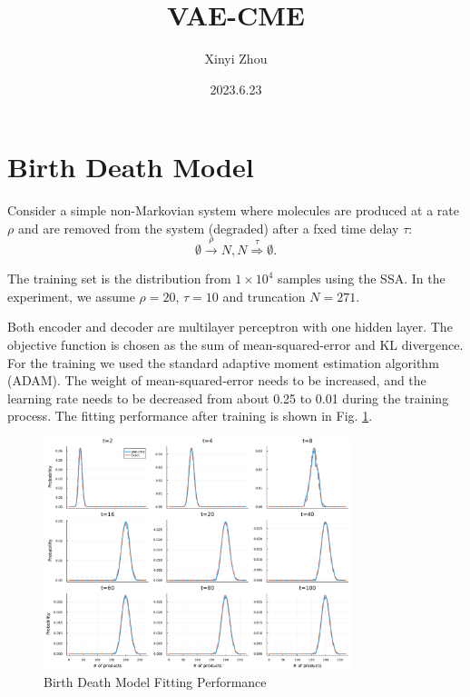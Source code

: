 \documentclass[a4paper,10pt]{article}
\title{VAE-CME}
\author{Xinyi Zhou}
\date{2023.6.23}
\begin{document}
\tableofcontents
\maketitle

\section{Birth Death Model}
Consider a simple non-Markovian system where molecules are produced at a rate $\rho$ and are removed from the system (degraded) after a fxed time delay $\tau$:
\begin{equation}\label{birth-death}
	\emptyset\stackrel{\rho}\rightarrow N, 
	N\stackrel{\tau}\Rightarrow\emptyset.
\end{equation}

The training set is the distribution from $1 \times 10^4$ samples using the SSA\cite{gillespie1977exact}. In the experiment, we assume $\rho=20$, $\tau=10$ and truncation $N=271$. 

Both encoder and decoder are multilayer perceptron with one hidden layer. The objective function is chosen as the sum of mean-squared-error and KL divergence. For the training we used the standard adaptive moment estimation algorithm (ADAM). The weight of mean-squared-error needs to be increased, and the learning rate needs to be decreased from about 0.25 to 0.01 during the training process. The fitting performance after training is shown in Fig. \ref{Birth Death Model Fitting}.
\begin{figure}[h]
	\centering
	\includegraphics[width=0.8\textwidth]{Figs/Birth_Death_fitting.pdf}
	\caption{Birth Death Model Fitting Performance}\label{Birth Death Model Fitting}  
\end{figure}
\newpage
\end{document}
